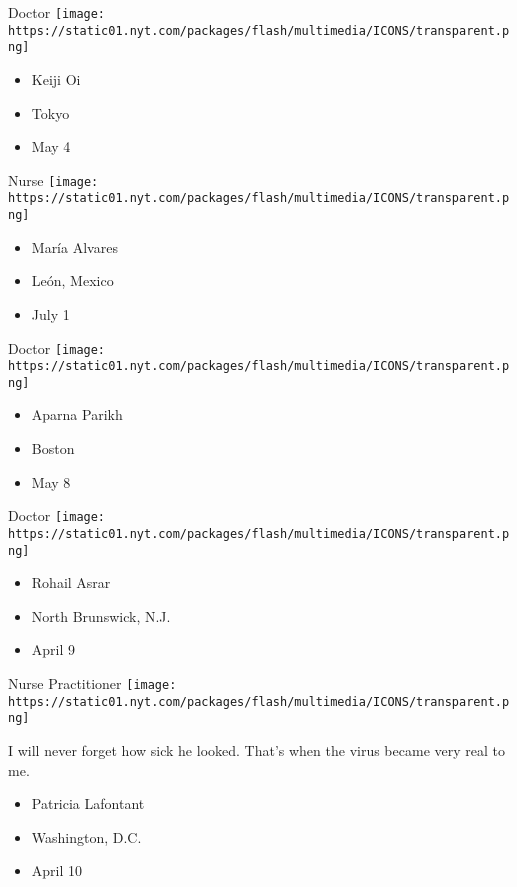 \protect\hyperlink{item-keiji-oi}{}

Doctor
\texttt{[image: https://static01.nyt.com/packages/flash/multimedia/ICONS/transparent.png]}

\begin{itemize}
\tightlist
\item
  Keiji Oi
\item
  Tokyo
\item
  May 4
\end{itemize}

\protect\hyperlink{item-maria-alvares}{}

Nurse
\texttt{[image: https://static01.nyt.com/packages/flash/multimedia/ICONS/transparent.png]}

\begin{itemize}
\tightlist
\item
  María Alvares
\item
  León, Mexico
\item
  July 1
\end{itemize}

\protect\hyperlink{item-aparna-parikh}{}

Doctor
\texttt{[image: https://static01.nyt.com/packages/flash/multimedia/ICONS/transparent.png]}

\begin{itemize}
\tightlist
\item
  Aparna Parikh
\item
  Boston
\item
  May 8
\end{itemize}

\protect\hyperlink{item-rohail-asrar}{}

Doctor
\texttt{[image: https://static01.nyt.com/packages/flash/multimedia/ICONS/transparent.png]}

\begin{itemize}
\tightlist
\item
  Rohail Asrar
\item
  North Brunswick, N.J.
\item
  April 9
\end{itemize}

\protect\hyperlink{item-patricia-lafontant}{}

Nurse Practitioner
\texttt{[image: https://static01.nyt.com/packages/flash/multimedia/ICONS/transparent.png]}

I will never forget how sick he looked. That's when the virus became
very real to me.

\begin{itemize}
\tightlist
\item
  Patricia Lafontant
\item
  Washington, D.C.
\item
  April 10
\end{itemize}

